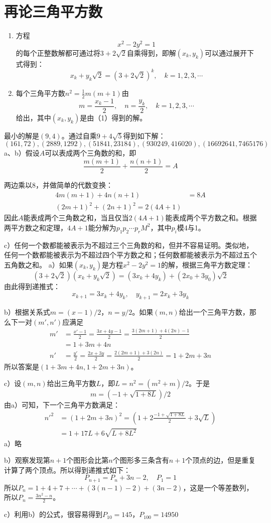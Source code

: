 \chapter{再论三角平方数}
\begin{theorem}[三角平方数定理]
\begin{enumerate}
\item 方程
\[x^2-2y^2=1\]
的每个正整数解都可通过将$3+2\sqrt2$自乘得到，即解$(x_k, y_k)$可以通过展开下式得到：
\[x_k+y_k\sqrt2=(3+2\sqrt2)^k,\quad k=1,2,3,\cdots\]
\item 每个三角平方数$n^2=\frac{1}{2}m(m+1)$由
\[m=\frac{x_k-1}{2},\quad n=\frac{y_k}{2},\quad k=1,2,3,\cdots\]
给出，其中$(x_k,y_k)$是由（1）得到的解。
\end{enumerate}
\end{theorem}
%
\exercise 最小的解是$(9, 4)$。通过自乘$9+4\sqrt5$得到如下解：
\[(161, 72),(2889, 1292),(51841, 23184),(930249, 416020),(16692641, 7465176)\]
%
\exercise a、b）假设$A$可以表成两个三角数的和，即
\[\frac{m(m+1)}{2}+\frac{n(n+1)}{2}=A\]\par
两边乘以8，并做简单的代数变换：
\begin{align*}
4m(m+1)+4n(n+1)&=8A \\
(2m+1)^2+(2n+1)^2=2(4A+1)
\end{align*}
因此$A$能表成两个三角数之和，当且仅当$2(4A+1)$能表成两个平方数之和。根据两平方数之和定理，$4A+1$能分解为$p_1p_2\cdots p_rM^2$，其中$p_i$模4与1。\par
c）任何一个数都能被表示为不超过三个三角数的和，但并不容易证明。类似地，任何一个数都能被表示为不超过四个平方数之和；任何数都能被表示为不超过五个五角数之和。
%
\exercise a）如果$(x_k,y_k)$是方程$x^2-2y^2=1$的解，根据三角平方数定理：
\[(3+2\sqrt2)(x_k+y_k\sqrt2)=(3x_k+4y_k)+(2x_0+3y_0)\sqrt2\]
由此得到递推式：
\[x_{k+1}=3x_k+4y_k,\quad y_{k+1}=2x_k+3y_k\]\par
b）根据关系式$m=(x-1)/2$，$n=y/2$。如果$(m,n)$给出一个三角平方数，那么下一对$(m',n')$应满足
\begin{align*}
m'&=\frac{x'-1}{2}=\frac{3x+4y-1}{2}=\frac{3(2m+1)+4(2n)-1}{2} \\
&=1+3m+4n \\
n'&=\frac{y'}{2}=\frac{2x+3y}{2}=\frac{2(2m+1)+3(2n)}{2}=1+2m+3n
\end{align*}
所以答案是$(1+3m+4n,1+2m+3n)$。\par
c）设$(m,n)$给出三角平方数$L$，即$L=n^2=(m^2+m)/2$。于是
\[m=(-1+\sqrt{1+8L})/2\]
由a）可知，下一个三角平方数满足：
\begin{align*}
n'^2&=(1+2m+3n)^2=\left(1+2\frac{-1+\sqrt{1+8L}}{2}+3\sqrt{L}\right)\\
&=1+17L+6\sqrt{L+8L^2}
\end{align*}
%
\exercise a）略\par
b）观察发现第$n+1$个图形会比第$n$个图形多三条含有$n+1$个顶点的边，但是重复计算了两个顶点。所以得到递推式如下：
\[P_{n+1}=P_n+3n-2,\quad P_1=1\]
所以$P_n=1+4+7+\cdots + (3(n-1) -2) + (3n-2)$，这是一个等差数列，所以$P_n=\frac{3n^2-n}{2}$。\par
c）利用b）的公式，很容易得到$P_{10}=145$，$P_{100}=14950$

